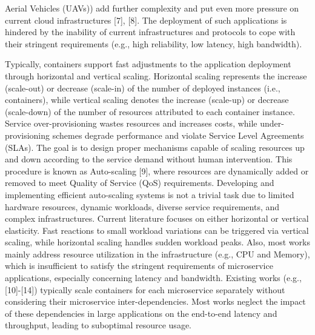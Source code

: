 \documentclass[10pt]{article}
\begin{document}
Aerial Vehicles (UAVs)) add further complexity and put even more pressure on current cloud infrastructures [7], [8]. The deployment of such applications is hindered by the inability of current infrastructures and protocols to cope with their stringent requirements (e.g., high reliability, low latency, high bandwidth).

Typically, containers support fast adjustments to the application deployment through horizontal and vertical scaling. Horizontal scaling represents the increase (scale-out) or decrease (scale-in) of the number of deployed instances (i.e., containers), while vertical scaling denotes the increase (scale-up) or decrease (scale-down) of the number of resources attributed to each container instance. Service over-provisioning wastes resources and increases costs, while under-provisioning schemes degrade performance and violate Service Level Agreements (SLAs). The goal is to design proper mechanisms capable of scaling resources up and down according to the service demand without human intervention. This procedure is known as Auto-scaling [9], where resources are dynamically added or removed to meet Quality of Service (QoS) requirements. Developing and implementing efficient auto-scaling systems is not a trivial task due to limited hardware resources, dynamic workloads, diverse service requirements, and complex infrastructures. Current literature focuses on either horizontal or vertical elasticity. Fast reactions to small workload variations can be triggered via vertical scaling, while horizontal scaling handles sudden workload peaks. Also, most works mainly address resource utilization in the infrastructure (e.g., CPU and Memory), which is insufficient to satisfy the stringent requirements of microservice applications, especially concerning latency and bandwidth. Existing works (e.g., [10]-[14]) typically scale containers for each microservice separately without considering their microservice inter-dependencies. Most works neglect the impact of these dependencies in large applications on the end-to-end latency and throughput, leading to suboptimal resource usage.
\end{document}
